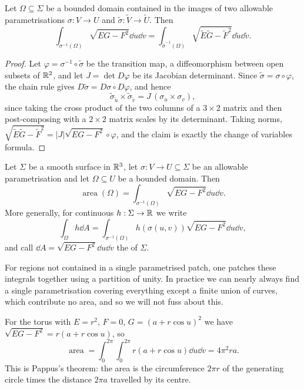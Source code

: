 \documentclass[a4paper]{scrartcl}
\begin{document}
\begin{lemma}
    Let $\Omega \subseteq \Sigma$ be a bounded domain contained in the images of two allowable parametrisations $\sigma: V \rightarrow U$ and $\tilde\sigma : \tilde V \rightarrow \tilde U$. Then
    $$
    \int_{\sigma^{-1}(\Omega)}\sqrt{EG-F^2}\dd u \dd v = \int_{\tilde\sigma^{-1}(\Omega)}\sqrt{\tilde E \tilde G - \tilde F^2}\dd \tilde u \dd \tilde v.
    $$
\end{lemma}
\begin{proof}
    Let $\varphi = \sigma^{-1}\circ\tilde\sigma$ be the transition map, a diffeomorphism between open subsets of $\mathbb{R}^2$, and let $J = \det D\varphi$ be its Jacobian determinant. Since $\tilde\sigma = \sigma\circ\varphi$, the chain rule gives $D\tilde\sigma = D\sigma \circ D\varphi$, and hence
    $$
    \tilde\sigma_{\tilde u}\times \tilde\sigma_{\tilde v} = J\,(\sigma_u \times \sigma_v),
    $$
    since taking the cross product of the two columns of a $3\times 2$ matrix and then post-composing with a $2\times2$ matrix scales by its determinant. Taking norms, $\sqrt{\tilde E\tilde G - \tilde F^2} = |J| \sqrt{EG-F^2}\circ\varphi$, and the claim is exactly the change of variables formula.
\end{proof}

\begin{definition}[Area]
    Let $\Sigma$ be a smooth surface in $\mathbb{R}^3$, let $\sigma: V \rightarrow U \subseteq \Sigma$ be an allowable parametrisation and let $\Omega \subseteq U$ be a bounded domain. Then
    $$
    \operatorname{area}(\Omega) = \int_{\sigma^{-1}(\Omega)} \sqrt{EG - F^2} \dd u \dd v.
    $$
    More generally, for continuous $h: \Sigma \rightarrow \mathbb{R}$ we write
    $$
    \int_\Omega h \dd A = \int_{\sigma^{-1}(\Omega)} h(\sigma(u,v))\sqrt{EG-F^2}\dd u \dd v,
    $$
    and call $\dd A = \sqrt{EG-F^2}\dd u \dd v$ the  of $\Sigma$.
\end{definition}

\begin{remark}
    For regions not contained in a single parametrised patch, one patches these integrals together using a partition of unity. In practice we can nearly always find a single parametrisation covering everything except a finite union of curves, which contribute no area, and so we will not fuss about this.
\end{remark}

\begin{example}
    For the torus with $E = r^2$, $F= 0$, $G = (a+r\cos u)^2$ we have $\sqrt{EG-F^2} = r(a + r\cos u)$, so
    $$
    \operatorname{area} = \int_0^{2\pi}\int_0^{2\pi} r(a+r\cos u)\dd u \dd v = 4\pi^2 ra.
    $$
    This is Pappus's theorem: the area is the circumference $2\pi r$ of the generating circle times the distance $2\pi a$ travelled by its centre.
\end{example}
\end{document}
